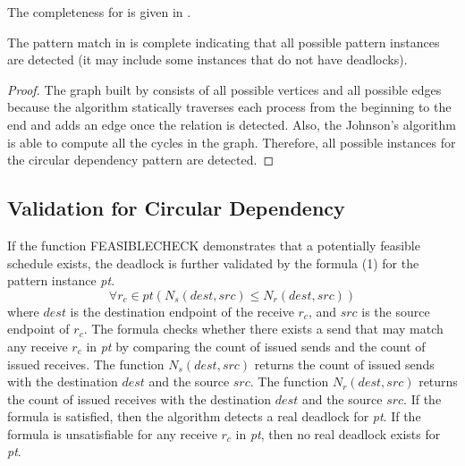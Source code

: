 The completeness for  is given in . 
\begin{lemma}
\label{lemma:pmcircular}
The pattern match in  is complete indicating that all possible pattern instances are detected (it may include some instances that do not have deadlocks).
\end{lemma}
\begin{proof}
The graph built by  consists of all possible vertices and all possible edges because the algorithm statically traverses each process from the beginning to the end and adds an edge once the relation is detected. Also, the Johnson's algorithm is able to compute all the cycles in the graph. Therefore, all possible instances for the circular dependency pattern are detected. 
\end{proof}

\subsection{Validation for Circular Dependency}


If the function \textrm{FEASIBLECHECK} demonstrates that a potentially feasible schedule exists, the deadlock is further validated by the formula (1) for the pattern instance \textit{pt}. 
\begin{equation}
\forall r_c\in \mathit{pt}(\mathit{N_s}(\mathit{dest},\mathit{src}) \leq \mathit{N_r}(\mathit{dest},\mathit{src}))
\end{equation}
where $\mathit{dest}$ is the destination endpoint of the receive $r_c$, and $\mathit{src}$ is the source endpoint of $r_c$. 
The formula checks whether there exists a send that may match any receive $\mathit{r_c}$ in \textit{pt} by comparing the count of issued sends and the count of issued receives.    
The function $\mathit{N_s}(\mathit{dest},\mathit{src})$ returns the count of issued sends with the destination $\mathit{dest}$ and the source $\mathit{src}$. The function $\mathit{N_r}(\mathit{dest},\mathit{src})$ returns the count of issued receives with the destination $\mathit{dest}$ and the source $\mathit{src}$.
If the formula is satisfied, then the algorithm detects a real deadlock for \textit{pt}.
If the formula is unsatisfiable for any receive $r_c$ in \textit{pt}, then no real deadlock exists for \textit{pt}.

